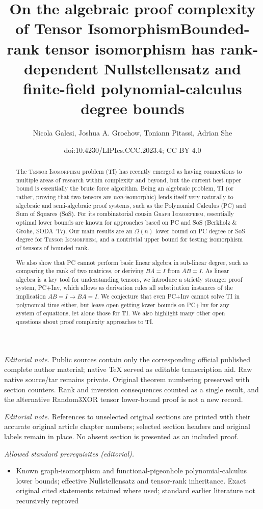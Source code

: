 \documentclass[10pt,a4paper]{article}
\title{On the algebraic proof complexity of Tensor Isomorphism}
\title{Bounded-rank tensor isomorphism has rank-dependent Nullstellensatz and finite-field polynomial-calculus degree bounds}
\author{Nicola Galesi, Joshua A. Grochow, Toniann Pitassi, Adrian She}
\date{doi:10.4230/LIPIcs.CCC.2023.4; CC BY 4.0}
\theoremstyle{definition}
\begin{document}
\maketitle
\noindent\textit{Editorial note.} Public sources contain only the corresponding official published complete author material; native TeX served as editable transcription aid. Raw native source/tar remains private. Original theorem numbering preserved with section counters. Rank and inversion consequences counted as a single result, and the alternative Random3XOR tensor lower-bound proof is not a new record.\par\medskip
\noindent\textit{Editorial note.} References to unselected original sections are printed with their accurate original article chapter numbers; selected section headers and original labels remain in place. No absent section is presented as an included proof.\par\medskip
\noindent\textit{Allowed standard prerequisites (editorial).}\begin{itemize}
\item Known graph-isomorphism and functional-pigeonhole polynomial-calculus lower bounds; effective Nullstellensatz and tensor-rank inheritance. Exact original cited statements retained where used; standard earlier literature not recursively reproved
\end{itemize}\medskip


\begin{abstract}
The \textsc{Tensor Isomorphism} problem (\textsc{TI}) has recently emerged as having connections to multiple areas of research within complexity and beyond, but the current best upper bound is essentially the brute force algorithm. Being an algebraic problem, \textsc{TI} (or rather, proving that two tensors are \emph{non}-isomorphic) lends itself very naturally to algebraic and semi-algebraic proof systems, such as the Polynomial Calculus (PC) and Sum of Squares (SoS). For its combinatorial cousin \textsc{Graph Isomorphism}, essentially optimal lower bounds are known for approaches based on PC and SoS (Berkholz \& Grohe, SODA '17). Our main results are an $\Omega(n)$ lower bound on PC degree or SoS degree for \textsc{Tensor Isomorphism}, and a nontrivial upper bound for testing isomorphism of tensors of bounded rank.

We also show that PC cannot perform basic linear algebra in sub-linear degree, such as comparing the rank of two matrices, or deriving $BA=I$ from $AB=I$. As linear algebra is a key tool for understanding tensors, we introduce a strictly stronger proof system, PC+Inv, which allows as derivation rules all substitution instances of the implication $AB=I \rightarrow BA=I$. We conjecture that even PC+Inv cannot solve  \textsc{TI} in polynomial time either, but leave open getting lower bounds on PC+Inv for any system of equations, let alone those for \textsc{TI}. We also highlight many other open questions about proof complexity approaches to \textsc{TI}.
\end{abstract}
\end{document}
